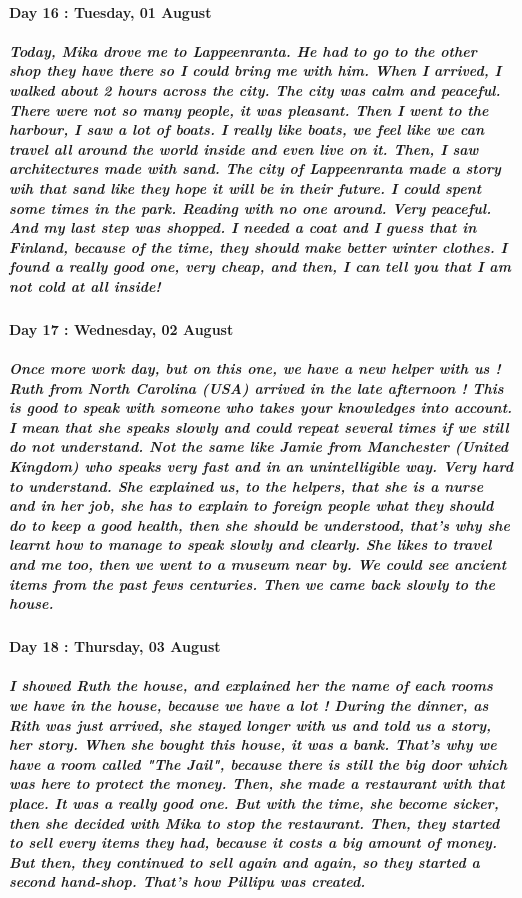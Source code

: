 \documentclass[a4paper,12pt]{report} %
\begin{document}
\paragraph{Day 16 : Tuesday, 01 August}
\subparagraph{Today, Mika drove me to Lappeenranta. He had to go to the other shop they have there so I could bring me with him. When I arrived, I walked about 2 hours across the city. The city was calm and peaceful. There were not so many people, it was pleasant. Then I went to the harbour, I saw a lot of boats. I really like boats, we feel like we can travel all around the world inside and even live on it. Then, I saw architectures made with sand. The city of Lappeenranta made a story wih that sand like they hope it will be in their future. I could spent some times in the park. Reading with no one around. Very peaceful. And my last step was shopped. I needed a coat and I guess that in Finland, because of the time, they should make better winter clothes. I found a really good one, very cheap, and then, I can tell you that I am not cold at all inside!}

\paragraph{Day 17 : Wednesday, 02 August}
\subparagraph{Once more work day, but on this one, we have a new helper with us ! Ruth from North Carolina (USA) arrived in the late afternoon ! This is good to speak with someone who takes your knowledges into account. I mean that she speaks slowly and could repeat several times if we still do not understand. Not the same like Jamie from Manchester (United Kingdom) who speaks very fast and in an unintelligible way. Very hard to understand. She explained us, to the helpers, that she is a nurse and in her job, she has to explain to foreign people what they should do to keep a good health, then she should be understood, that's why she learnt how to manage to speak slowly and clearly. She likes to travel and me too, then we went to a museum near by. We could see ancient items from the past fews centuries. Then we came back slowly to the house.}

\paragraph{Day 18 : Thursday, 03 August}
\subparagraph{I showed Ruth the house, and explained her the name of each rooms we have in the house, because we have a lot ! During the dinner, as Rith was just arrived, she stayed longer with us and told us a story, her story. When she bought this house, it was a bank. That's why we have a room called "The Jail", because there is still the big door which was here to protect the money. Then, she made a restaurant with that place. It was a really good one. But with the time, she become sicker, then she decided with Mika to stop the restaurant. Then, they started to sell every items they had, because it costs a big amount of money. But then, they continued to sell again and again, so they started a second hand-shop. That's how Pillipu was created.}
\end{document}
